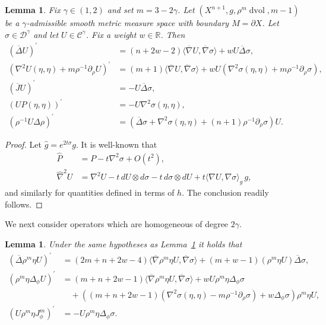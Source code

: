 \documentclass{amsart}
\newtheorem{lem}[thm]{Lemma}
\theoremstyle{definition}
\theoremstyle{remark}
\numberwithin{equation}{section}
\begin{document}
\begin{lem}
 \label{lem:2}
 Fix $\gamma\in(1,2)$ and set $m=3-2\gamma$.  Let $(X^{n+1},g,\rho^m\operatorname{dvol},m-1)$ be a $\gamma$-admissible smooth metric measure space with boundary $M=\partial X$.  Let $\sigma\in{\mathcal{D}}^\gamma$ and let $U\in{\mathcal{C}}^\gamma$.  Fix a weight $w\in{\mathbb{R}}$.  Then
 \begin{align*}
  \left({\overline{\Delta}} U\right)^\prime & = (n+2w-2){\langle}{\overline{\nabla}} U,{\overline{\nabla}}\sigma{\rangle} + wU{\overline{\Delta}}\sigma, \\
  \left(\nabla^2U(\eta,\eta)+m\rho^{-1}\partial_\rho U\right)^\prime & = (m+1){\langle}{\overline{\nabla}} U,{\overline{\nabla}}\sigma{\rangle} + wU\left(\nabla^2\sigma(\eta,\eta)+m\rho^{-1}\partial_\rho\sigma\right), \\
  \left({\overline{J}} U\right)^\prime & = -U{\overline{\Delta}}\sigma , \\
  \left(UP(\eta,\eta)\right)^\prime & = -U\nabla^2\sigma(\eta,\eta), \\
  \left(\rho^{-1}U\Delta\rho\right)^\prime & = \left({\overline{\Delta}}\sigma + \nabla^2\sigma(\eta,\eta) + (n+1)\rho^{-1}\partial_\rho\sigma\right)U .
 \end{align*}
\end{lem}

\begin{proof}
 Let ${\widehat{g}}=e^{2t\sigma}g$.  It is well-known that
 \begin{align*}
  {\widehat{P}} & = P - t\nabla^2\sigma + O(t^2), \\
  {\widehat{\nabla}}^2U & = \nabla^2U - t\,dU\otimes d\sigma - t\,d\sigma\otimes dU + t{\langle}\nabla U,\nabla\sigma{\rangle}_g\,g ,
 \end{align*}
 and similarly for quantities defined in terms of $h$.  The conclusion readily follows.
\end{proof}

We next consider operators which are homogeneous of degree $2\gamma$.

\begin{lem}
 \label{lem:3}
 Under the same hypotheses as Lemma~\ref{lem:2} it holds that
 \begin{align*}
  \left({\overline{\Delta}}\rho^m\eta U\right)^\prime & = (2m+n+2w-4){\langle}{\overline{\nabla}}\rho^m\eta U,{\overline{\nabla}}\sigma{\rangle} + (m+w-1)\left(\rho^m\eta U\right){\overline{\Delta}}\sigma , \\
  \left(\rho^m\eta\Delta_\phi U\right)^\prime & = (m+n+2w-1){\langle}{\overline{\nabla}}\rho^m\eta U,{\overline{\nabla}}\sigma{\rangle} + wU\rho^m\eta\Delta_\phi\sigma \\
  & \quad + \left((m+n+2w-1)(\nabla^2\sigma(\eta,\eta)-m\rho^{-1}\partial_\rho\sigma) + w\Delta_\phi\sigma\right)\rho^m\eta U , \\
  \left(U\rho^m\eta J_\phi^m\right)^\prime & = -U\rho^m\eta\Delta_\phi\sigma .
 \end{align*}
\end{lem}
\end{document}
